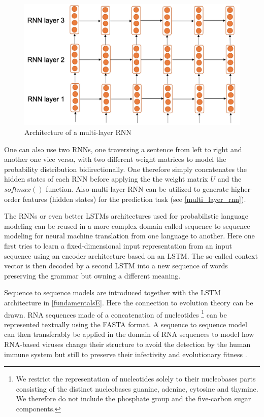 \begin{figure}[ht]
	\centering
	\includegraphics[width=0.8\linewidth]{figures/multi_layer_rnn.png}
	\caption{Architecture of a multi-layer  \ac{RNN} \cite{Gertz2020}}
	\label{multi_layer_rnn}
\end{figure}

One can also use two \acp{RNN}, one traversing a sentence from left to right and another one vice versa, with two different weight matrices to model the probability distribution bidirectionally. One therefore simply concatenates the hidden states of each \ac{RNN} before applying the the weight matrix $U$ and the $softmax()$ function. Also multi-layer \acs{RNN} can be utilized to generate higher-order features (hidden states) for the prediction task (see \autoref{multi_layer_rnn}). \cite{Gertz2020}

The \acp{RNN} or even better \acp{LSTM} architectures used for probabilistic language modeling can be reused in a more complex domain called sequence to sequence modeling for neural machine translation from one language to another. Here one first tries to learn a fixed-dimensional input representation from an input sequence using an encoder architecture based on an \ac{LSTM}. The so-called context vector is then decoded by a second \ac{LSTM} into a new sequence of words preserving the grammar but owning a different meaning. \cite{Sutskever2014}

Sequence to sequence models are introduced together with the \ac{LSTM} architecture in \autoref{fundamentalsE}. Here the connection to evolution theory can be drawn. \ac{RNA} sequences made of a concatenation of nucleotides \footnote{We restrict the representation of nucleotides solely to their nucleobases parts consisting of the distinct nucleobases guanine, adenine, cytosine and thymine. We therefore do not include the phosphate group and the five-carbon sugar components.} can be represented textually using the FASTA format. A sequence to sequence model can then transferably be applied in the domain of \ac{RNA} sequences to model how \ac{RNA}-based viruses change their structure to avoid the detection by the human immune system but still to preserve their infectivity and evolutionary fitness \cite{Hie2021}. 

